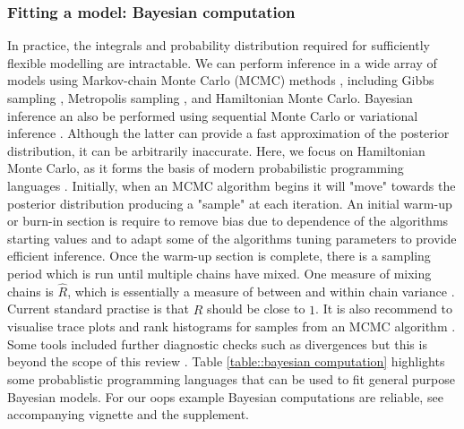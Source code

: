 \documentclass[12pt,english, journal=jpr, layout=twocolumn]{article}
\begin{document}
\subsubsection{Fitting a model: Bayesian computation}
In practice, the integrals and probability distribution required for sufficiently flexible modelling are intractable. We can perform inference in a wide array of models using Markov-chain Monte Carlo (MCMC) methods \citep{Gilks::1995, Brooks::2011}, including Gibbs sampling \citep{Smith::1993, Gelfand::2000}, Metropolis sampling \citep{Robert::1999}, and Hamiltonian Monte Carlo\citep{Hoffman::2014}. Bayesian inference an also be performed using sequential Monte Carlo \citep{Del::2006} or variational inference \citep{Blei::2017}. Although the latter can provide a fast approximation of the posterior distribution, it can be arbitrarily inaccurate. Here, we focus on Hamiltonian Monte Carlo, as it forms the basis of modern probabilistic programming languages \citep{Carpenter::2017}. Initially, when an MCMC algorithm begins it will "move" towards the posterior distribution producing a "sample" at each iteration. An initial warm-up or burn-in section is require to remove bias due to dependence of the algorithms starting values and to adapt some of the algorithms tuning parameters to provide efficient inference. Once the warm-up section is complete, there is a sampling period which is run until multiple chains have mixed. One measure of mixing chains is $\hat{R}$, which is essentially a measure of between and within chain variance \citep{Vehtari::2019}. Current standard practise is that $\hat{R}$ should be close to $1$. It is also recommend to visualise trace plots and rank histograms for samples from an MCMC algorithm \citep{Gabry::2019}. Some tools included further diagnostic checks such as divergences but this is beyond the scope of this review \citep{Betancourt::2017}. Table \ref{table::bayesian computation} highlights some probablistic programming languages that can be used to fit general purpose Bayesian models. For our oops example Bayesian computations are reliable, see accompanying vignette and the supplement.
\end{document}
